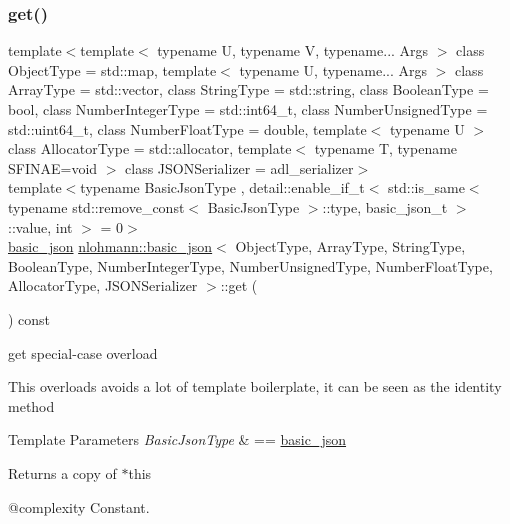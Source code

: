 \subsubsection{\texorpdfstring{get()}{get()}\hspace{0.1cm}{\footnotesize\ttfamily [1/5]}}
{\footnotesize\ttfamily template$<$template$<$ typename U, typename V, typename... Args $>$ class Object\+Type = std\+::map, template$<$ typename U, typename... Args $>$ class Array\+Type = std\+::vector, class String\+Type  = std\+::string, class Boolean\+Type  = bool, class Number\+Integer\+Type  = std\+::int64\+\_\+t, class Number\+Unsigned\+Type  = std\+::uint64\+\_\+t, class Number\+Float\+Type  = double, template$<$ typename U $>$ class Allocator\+Type = std\+::allocator, template$<$ typename T, typename S\+F\+I\+N\+A\+E=void $>$ class J\+S\+O\+N\+Serializer = adl\+\_\+serializer$>$ \\
template$<$typename Basic\+Json\+Type , detail\+::enable\+\_\+if\+\_\+t$<$ std\+::is\+\_\+same$<$ typename std\+::remove\+\_\+const$<$ Basic\+Json\+Type $>$\+::type, basic\+\_\+json\+\_\+t $>$\+::value, int $>$  = 0$>$ \\
\mbox{\hyperlink{classnlohmann_1_1basic__json}{basic\+\_\+json}} \mbox{\hyperlink{classnlohmann_1_1basic__json}{nlohmann\+::basic\+\_\+json}}$<$ Object\+Type, Array\+Type, String\+Type, Boolean\+Type, Number\+Integer\+Type, Number\+Unsigned\+Type, Number\+Float\+Type, Allocator\+Type, J\+S\+O\+N\+Serializer $>$\+::get (\begin{DoxyParamCaption}{ }\end{DoxyParamCaption}) const\hspace{0.3cm}{\ttfamily [inline]}}



get special-\/case overload 

This overloads avoids a lot of template boilerplate, it can be seen as the identity method


\begin{DoxyTemplParams}{Template Parameters}
{\em Basic\+Json\+Type} & == \mbox{\hyperlink{classnlohmann_1_1basic__json}{basic\+\_\+json}}\\
\hline
\end{DoxyTemplParams}
\begin{DoxyReturn}{Returns}
a copy of $\ast$this
\end{DoxyReturn}
@complexity Constant.

